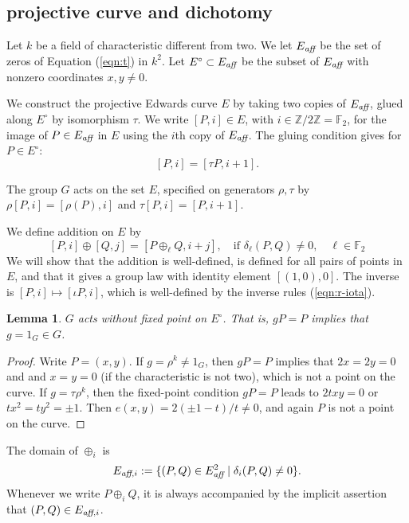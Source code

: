 \documentclass[12pt]{article}
\newtheorem{lemma}[theorem]{Lemma}
\newcommand{\ring}[1]{\mathbb{#1}}
\newcommand{\op}[1]{\hbox{#1}}
\newcommand{\Eaff}{E_{\op{\scriptsize\it aff}}}
\newcommand{\Eaf}[1]{E_{\op{\scriptsize\it aff},{#1}}}
\newcommand{\Eoo}{E^{\circ}} %
\begin{document}
\subsection{projective curve and dichotomy}

Let $k$ be a field of characteristic different from two.  We let
$\Eaff$ be the set of zeros of Equation (\ref{eqn:t}) in $k^2$.  Let
$\Eoo\subset \Eaff$ be the subset of $\Eaff$ with nonzero coordinates
$x,y\ne0$.

We construct the projective Edwards curve $E$ by taking two copies of
$\Eaff$, glued along $\Eoo$ by isomorphism $\tau$.  We write $[P,i]\in
E$, with $i\in \ring{Z}/2\ring{Z}=\ring{F}_2$, for the image of $P\in
\Eaff$ in $E$ using the $i$th copy of $\Eaff$.  The gluing condition
gives for $P\in \Eoo$:
\begin{equation}\label{eqn:glue}
[P,i]=[\tau P,i+1].
\end{equation}

The group $G$ acts on the set $E$, specified on generators $\rho,\tau$
by $\rho[P,i]=[\rho(P),i]$ and $\tau[P,i]=[P,i+1]$.

We define addition on $E$ by
\begin{equation}\label{eqn:add-proj}
[P,i]\oplus [Q,j] = [P\oplus_\ell Q,i+j],\quad 
\text{if } \delta_\ell(P,Q)\ne 0,\quad \ell\in\ring{F}_2
\end{equation}
We will show that the addition is well-defined, is defined for all
pairs of points in $E$, and that it gives a group law with identity
element $[(1,0),0]$.  The inverse is $[P,i]\mapsto [\iota P,i]$, which
is well-defined by the inverse rules (\ref{eqn:r-iota}).


\begin{lemma} \label{lemma:no-fix} $G$ acts without fixed point on
  $\Eoo$.  That is, $g P = P$ implies that $g=1_G\in G$.
\end{lemma}

\begin{proof} Write $P=(x,y)$.  If $g = \rho^k\ne 1_G$, then $g P = P$
  implies that $2x=2y=0$ and and $x=y=0$ (if the characteristic is not
  two), which is not a point on the curve.  If $g = \tau \rho^k$, then
  the fixed-point condition $g P = P$ leads to $2t x y=0$ or $t x^2 =
  t y^2 =\pm 1$.  Then $e(x,y) = 2 (\pm1-t)/t\ne0$, and again $P$ is
  not a point on the curve.
\end{proof}

The domain of $\oplus_i$ is
\[
\Eaf{i} := \{(P,Q)\in \Eaff^2\mid \delta_i(P,Q)\ne0\}.
\]
Whenever we write $P\oplus_i Q$, it is always accompanied by the
implicit assertion that $(P,Q)\in \Eaf{i}$.
\end{document}
